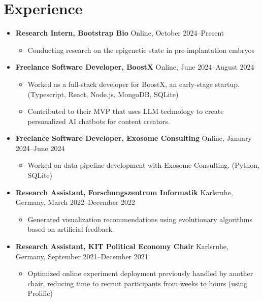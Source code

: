 \documentclass[letterpaper, 9pt]{article}
\begin{document}
\section*{Experience}
\begin{itemize}
    \item \textbf{Research Intern, Bootstrap Bio} \hfill Online, October 2024--Present
    \begin{itemize}
       \item Conducting research on the epigenetic state in pre-implantation embryos
    \end{itemize}
    \item \textbf{Freelance Software Developer, BoostX} \hfill Online, June 2024--August 2024
    \begin{itemize}
       \item Worked as a full-stack developer for BoostX, an early-stage startup. (Typescript, React, Node.js, MongoDB, SQLite)
       \item Contributed to their MVP that uses LLM technology to create personalized AI chatbots for content creators.
    \end{itemize}
    \item \textbf{Freelance Software Developer, Exosome Consulting} \hfill Online, January 2024--June 2024
    \begin{itemize}
       \item Worked on data pipeline development with Exosome Consulting. (Python, SQLite)
    \end{itemize}
    \item \textbf{Research Assistant, Forschungszentrum Informatik} \hfill Karlsruhe, Germany, March 2022--December 2022
    \begin{itemize}
        \item Generated visualization recommendations using evolutionary algorithms based on artificial feedback.
    \end{itemize}
    \item \textbf{Research Assistant, KIT Political Economy Chair} \hfill Karlsruhe, Germany, September 2021--December 2021
    \begin{itemize}
        \item Optimized online experiment deployment previously handled by another chair, reducing time to recruit participants from weeks to hours (using Prolific)
    \end{itemize}
\end{itemize}
\end{document}
